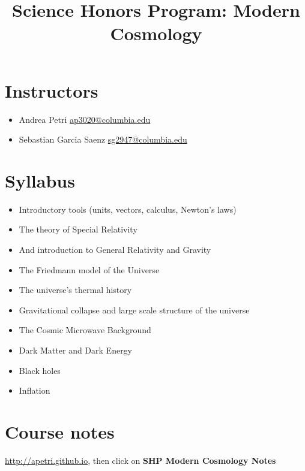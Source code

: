 \documentclass[11pt, a4paper,oneside,openright]{article}
\numberwithin{equation}{section}
\begin{document}
\title{Science Honors Program: Modern Cosmology}
\author{}
\date{}
\maketitle

\section*{Instructors}
\begin{itemize}
\item Andrea Petri \url{ap3020@columbia.edu}
\item Sebastian Garcia Saenz \url{sg2947@columbia.edu}
\end{itemize}

\section*{Syllabus}
\begin{itemize}
\item Introductory tools (units, vectors, calculus, Newton's laws)
\item The theory of Special Relativity
\item And introduction to General Relativity and Gravity
\item The Friedmann model of the Universe
\item The universe's thermal history
\item Gravitational collapse and large scale structure of the universe
\item The Cosmic Microwave Background
\item Dark Matter and Dark Energy
\item Black holes
\item Inflation
\end{itemize}

\section*{Course notes}
\url{http://apetri.github.io}, then click on \textbf{SHP Modern Cosmology Notes}
\end{document}
